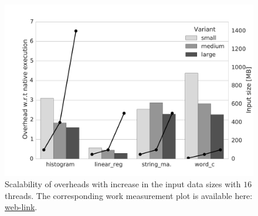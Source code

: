 
\begin{figure}[t]
\centering
\includegraphics[scale=0.22]{figure/benchmarks/worksize-times-Total_overheads.pdf}
\caption{Scalability of overheads with increase in the input data sizes with $16$ threads. The corresponding work measurement plot is available here: \href{https://mic92.github.io/inspector/index.html\#graph6}{web-link}.}
\label{fig:data-size-overheads}
\end{figure}
